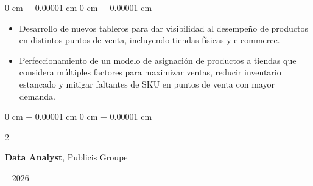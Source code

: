 \documentclass[10pt, letterpaper]{article}
\newenvironment{highlights}{
    \begin{itemize}[
        topsep=0.10 cm,
        parsep=0.10 cm,
        partopsep=0pt,
        itemsep=0pt,
        leftmargin=0 cm + 10pt
    ]
}{
    \end{itemize}
} %
\newenvironment{onecolentry}{
    \begin{adjustwidth}{
        0 cm + 0.00001 cm
    }{
        0 cm + 0.00001 cm
    }
}{
    \end{adjustwidth}
} %
\newenvironment{twocolentry}[2][]{
    \onecolentry
    \def\secondColumn{#2}
    \setcolumnwidth{\fill, 4.5 cm}
    \begin{paracol}{2}
}{
    \switchcolumn \raggedleft \secondColumn
    \end{paracol}
    \endonecolentry
} %
\begin{document}
\begin{onecolentry}
\begin{highlights}
        \item Desarrollo de nuevos tableros para dar visibilidad al desempeño de productos en distintos puntos de venta, incluyendo tiendas físicas y e-commerce.

        \item Perfeccionamiento de un modelo de asignación de productos a tiendas que considera múltiples factores para maximizar ventas, reducir inventario estancado y mitigar faltantes de SKU en puntos de venta con mayor demanda.
    \end{highlights}
\end{onecolentry}
        \begin{twocolentry}{
            2025 -- 2026
        }           
    \textbf{Data Analyst}, Publicis Groupe
\end{twocolentry}
\vspace{0.10 cm}
\end{document}
